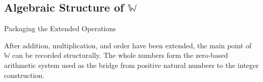 
\subsection{Algebraic Structure of \texorpdfstring{$\mathbb{W}$}{W}}
\label{sec:algebraic-structure-of-w}
\begin{topicbox}{Packaging the Extended Operations}
\begin{exposition}
After addition, multiplication, and order have been extended, the main point
of $\mathbb{W}$ can be recorded structurally. The whole numbers form the
zero-based arithmetic system used as the bridge from positive natural numbers
to the integer construction.
\end{exposition}
\end{topicbox}
